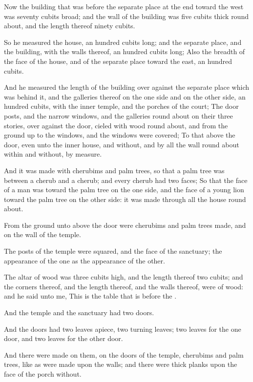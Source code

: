 \verse Now the building that was before the separate place at the end toward the west was seventy cubits broad; and the wall of the building was five cubits thick round about, and the length thereof ninety cubits.

\verse So he measured the house, an hundred cubits long; and the separate place, and the building, with the walls thereof, an hundred cubits long; \verse Also the breadth of the face of the house, and of the separate place toward the east, an hundred cubits.

\verse And he measured the length of the building over against the separate place which was behind it, and the galleries thereof on the one side and on the other side, an hundred cubits, with the inner temple, and the porches of the court; \verse The door posts, and the narrow windows, and the galleries round about on their three stories, over against the door, cieled with wood round about, and from the ground up to the windows, and the windows were covered; \verse To that above the door, even unto the inner house, and without, and by all the wall round about within and without, by measure.

\verse And it was made with cherubims and palm trees, so that a palm tree was between a cherub and a cherub; and every cherub had two faces; \verse So that the face of a man was toward the palm tree on the one side, and the face of a young lion toward the palm tree on the other side: it was made through all the house round about.

\verse From the ground unto above the door were cherubims and palm trees made, and on the wall of the temple.

\verse The posts of the temple were squared, and the face of the sanctuary; the appearance of the one as the appearance of the other.

\verse The altar of wood was three cubits high, and the length thereof two cubits; and the corners thereof, and the length thereof, and the walls thereof, were of wood: and he said unto me, This is the table that is before the \LORD.

\verse And the temple and the sanctuary had two doors.

\verse And the doors had two leaves apiece, two turning leaves; two leaves for the one door, and two leaves for the other door.

\verse And there were made on them, on the doors of the temple, cherubims and palm trees, like as were made upon the walls; and there were thick planks upon the face of the porch without.

